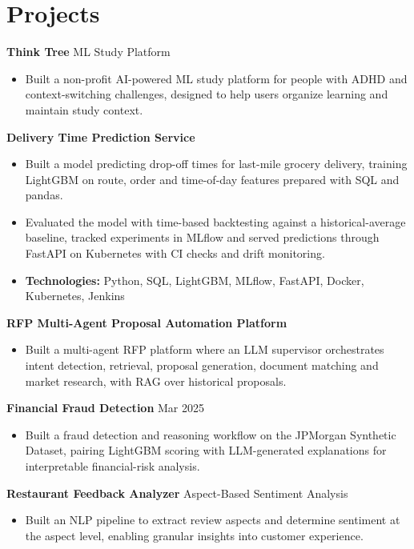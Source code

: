 \documentclass[10pt,a4paper]{article}
\begin{document}
\section{Projects}
\textbf{Think Tree} \textbar{} ML Study Platform\par
\begin{itemize}
  \item Built a non-profit AI-powered ML study platform for people with ADHD and context-switching challenges, designed to help users organize learning and maintain study context.
\end{itemize}
\textbf{Delivery Time Prediction Service}\par
\begin{itemize}
  \item Built a model predicting drop-off times for last-mile grocery delivery, training LightGBM on route, order and time-of-day features prepared with SQL and pandas.
  \item Evaluated the model with time-based backtesting against a historical-average baseline, tracked experiments in MLflow and served predictions through FastAPI on Kubernetes with CI checks and drift monitoring.
  \item \textbf{Technologies:} Python, SQL, LightGBM, MLflow, FastAPI, Docker, Kubernetes, Jenkins
\end{itemize}
\textbf{RFP Multi-Agent Proposal Automation Platform}\par
\begin{itemize}
  \item Built a multi-agent RFP platform where an LLM supervisor orchestrates intent detection, retrieval, proposal generation, document matching and market research, with RAG over historical proposals.
\end{itemize}
\textbf{Financial Fraud Detection} \textbar{} Mar 2025\par
\begin{itemize}
  \item Built a fraud detection and reasoning workflow on the JPMorgan Synthetic Dataset, pairing LightGBM scoring with LLM-generated explanations for interpretable financial-risk analysis.
\end{itemize}
\textbf{Restaurant Feedback Analyzer} \textbar{} Aspect-Based Sentiment Analysis\par
\begin{itemize}
  \item Built an NLP pipeline to extract review aspects and determine sentiment at the aspect level, enabling granular insights into customer experience.
\end{itemize}
\end{document}
